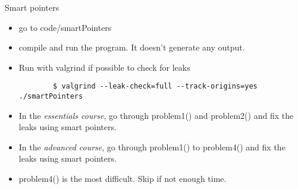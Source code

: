 \begin{frame}[fragile]
  \begin{exercise}{Smart pointers}
    \begin{itemize}
    \item go to code/smartPointers
    \item compile and run the program. It doesn't generate any output.
    \item Run with valgrind if possible to check for leaks
      { \scriptsize
      \begin{verbatim}
        $ valgrind --leak-check=full --track-origins=yes ./smartPointers
      \end{verbatim}
      }
    \item In the \emph{essentials course}, go through {\ttfamily problem1()} and {\ttfamily problem2()} and fix the leaks using smart pointers.
    \item In the \emph{advanced course}, go through {\ttfamily problem1()} to {\ttfamily problem4()} and fix the leaks using smart pointers.
    \item {\ttfamily problem4()} is the most difficult. Skip if not enough time.
    \end{itemize}
  \end{exercise}
\end{frame}
